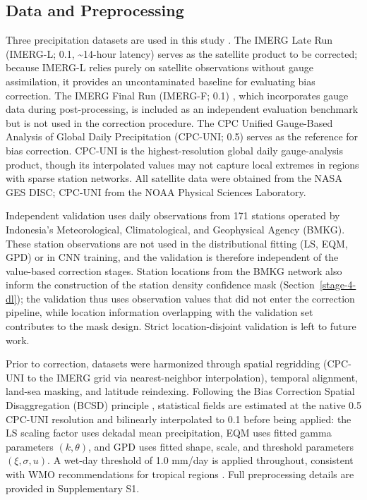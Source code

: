\documentclass[11pt,a4paper]{article}
\begin{document}
\subsection{Data and Preprocessing}\label{data-and-preprocessing}

Three precipitation datasets are used in this study \cite{ref22}. The IMERG Late Run (IMERG-L; 0.1\textdegree, \textasciitilde14-hour latency) \cite{ref2,ref21} serves as the satellite product to be corrected; because IMERG-L relies purely on satellite observations without gauge assimilation, it provides an uncontaminated baseline for evaluating bias correction. The IMERG Final Run (IMERG-F; 0.1\textdegree) \cite{ref2}, which incorporates gauge data during post-processing, is included as an independent evaluation benchmark but is not used in the correction procedure. The CPC Unified Gauge-Based Analysis of Global Daily Precipitation (CPC-UNI; 0.5\textdegree) \cite{ref13,ref18} serves as the reference for bias correction. CPC-UNI is the highest-resolution global daily gauge-analysis product, though its interpolated values may not capture local extremes in regions with sparse station networks. All satellite data were obtained from the NASA GES DISC; CPC-UNI from the NOAA Physical Sciences Laboratory.

Independent validation uses daily observations from 171 stations operated by Indonesia's Meteorological, Climatological, and Geophysical Agency (BMKG). These station observations are not used in the distributional fitting (LS, EQM, GPD) or in CNN training, and the validation is therefore independent of the value-based correction stages. Station locations from the BMKG network also inform the construction of the station density confidence mask (Section~\ref{stage-4-dl}); the validation thus uses observation values that did not enter the correction pipeline, while location information overlapping with the validation set contributes to the mask design. Strict location-disjoint validation is left to future work.

Prior to correction, datasets were harmonized through spatial regridding (CPC-UNI to the IMERG grid via nearest-neighbor interpolation), temporal alignment, land-sea masking, and latitude reindexing. Following the Bias Correction Spatial Disaggregation (BCSD) principle \cite{ref23}, statistical fields are estimated at the native 0.5\textdegree{} CPC-UNI resolution and bilinearly interpolated to 0.1\textdegree{} before being applied: the LS scaling factor uses dekadal mean precipitation, EQM uses fitted gamma parameters \((k, \theta)\), and GPD uses fitted shape, scale, and threshold parameters \((\xi, \sigma, u)\). A wet-day threshold of 1.0 mm/day is applied throughout, consistent with WMO recommendations for tropical regions \cite{ref24}. Full preprocessing details are provided in Supplementary S1.
\end{document}
